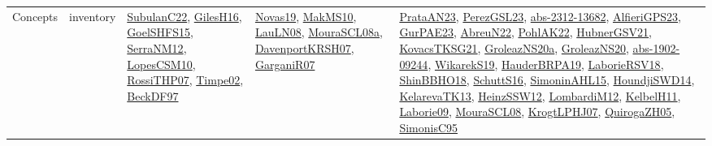 {\begin{longtable}{lp{3cm}>{\raggedright}p{6cm}>{\raggedright}p{6cm}p{8cm}}
Concepts & inventory & \href{articles/SubulanC22.pdf}{SubulanC22}\cite{SubulanC22}, \href{papers/GilesH16.pdf}{GilesH16}\cite{GilesH16}, \href{articles/GoelSHFS15.pdf}{GoelSHFS15}\cite{GoelSHFS15}, \href{papers/SerraNM12.pdf}{SerraNM12}\cite{SerraNM12}, \href{articles/LopesCSM10.pdf}{LopesCSM10}\cite{LopesCSM10}, \href{papers/RossiTHP07.pdf}{RossiTHP07}\cite{RossiTHP07}, \href{articles/Timpe02.pdf}{Timpe02}\cite{Timpe02}, \href{papers/BeckDF97.pdf}{BeckDF97}\cite{BeckDF97} & \href{articles/Novas19.pdf}{Novas19}\cite{Novas19}, \href{papers/MakMS10.pdf}{MakMS10}\cite{MakMS10}, \href{papers/LauLN08.pdf}{LauLN08}\cite{LauLN08}, \href{papers/MouraSCL08a.pdf}{MouraSCL08a}\cite{MouraSCL08a}, \href{papers/DavenportKRSH07.pdf}{DavenportKRSH07}\cite{DavenportKRSH07}, \href{papers/GarganiR07.pdf}{GarganiR07}\cite{GarganiR07} & \href{articles/PrataAN23.pdf}{PrataAN23}\cite{PrataAN23}, \href{papers/PerezGSL23.pdf}{PerezGSL23}\cite{PerezGSL23}, \href{articles/abs-2312-13682.pdf}{abs-2312-13682}\cite{abs-2312-13682}, \href{articles/AlfieriGPS23.pdf}{AlfieriGPS23}\cite{AlfieriGPS23}, \href{articles/GurPAE23.pdf}{GurPAE23}\cite{GurPAE23}, \href{articles/AbreuN22.pdf}{AbreuN22}\cite{AbreuN22}, \href{articles/PohlAK22.pdf}{PohlAK22}\cite{PohlAK22}, \href{articles/HubnerGSV21.pdf}{HubnerGSV21}\cite{HubnerGSV21}, \href{papers/KovacsTKSG21.pdf}{KovacsTKSG21}\cite{KovacsTKSG21}, \href{papers/GroleazNS20a.pdf}{GroleazNS20a}\cite{GroleazNS20a}, \href{papers/GroleazNS20.pdf}{GroleazNS20}\cite{GroleazNS20}, \href{articles/abs-1902-09244.pdf}{abs-1902-09244}\cite{abs-1902-09244}, \href{articles/WikarekS19.pdf}{WikarekS19}\cite{WikarekS19}, \href{articles/HauderBRPA19.pdf}{HauderBRPA19}\cite{HauderBRPA19}, \href{articles/LaborieRSV18.pdf}{LaborieRSV18}\cite{LaborieRSV18}, \href{articles/ShinBBHO18.pdf}{ShinBBHO18}\cite{ShinBBHO18}, \href{papers/SchuttS16.pdf}{SchuttS16}\cite{SchuttS16}, \href{articles/SimoninAHL15.pdf}{SimoninAHL15}\cite{SimoninAHL15}, \href{papers/HoundjiSWD14.pdf}{HoundjiSWD14}\cite{HoundjiSWD14}, \href{papers/KelarevaTK13.pdf}{KelarevaTK13}\cite{KelarevaTK13}, \href{articles/HeinzSSW12.pdf}{HeinzSSW12}\cite{HeinzSSW12}, \href{articles/LombardiM12.pdf}{LombardiM12}\cite{LombardiM12}, \href{articles/KelbelH11.pdf}{KelbelH11}\cite{KelbelH11}, \href{papers/Laborie09.pdf}{Laborie09}\cite{Laborie09}, \href{papers/MouraSCL08.pdf}{MouraSCL08}\cite{MouraSCL08}, \href{papers/KrogtLPHJ07.pdf}{KrogtLPHJ07}\cite{KrogtLPHJ07}, \href{papers/QuirogaZH05.pdf}{QuirogaZH05}\cite{QuirogaZH05}, \href{papers/SimonisC95.pdf}{SimonisC95}\cite{SimonisC95}\\

\end{longtable}}
